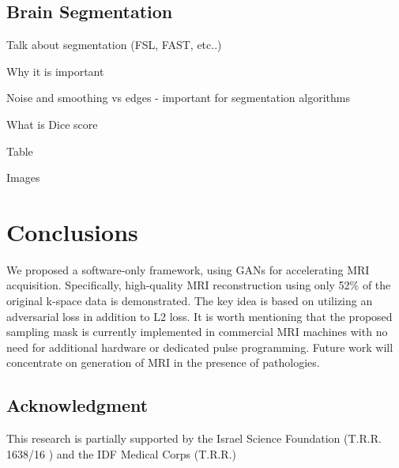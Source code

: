 \documentclass[review]{elsarticle}
\begin{document}
\subsection{Brain Segmentation}
Talk about segmentation (FSL, FAST, etc..)

Why it is important

Noise and smoothing vs edges - important for segmentation algorithms

What is Dice score

Table

Images






\section{Conclusions}


We proposed a software-only framework, using GANs for accelerating
MRI acquisition. Specifically, high-quality MRI reconstruction using
only 52\% of the original k-space data is demonstrated. The key idea
is based on utilizing an adversarial loss in addition to L2 loss.
It is worth mentioning that the proposed sampling mask is currently
implemented in commercial MRI machines with no need for additional
hardware or dedicated pulse programming. Future work will concentrate
on generation of MRI in the presence of pathologies.


\subsection{Acknowledgment}
This research is partially supported by the Israel Science Foundation (T.R.R. 1638/16 ) and the IDF Medical Corps (T.R.R.)
\end{document}
